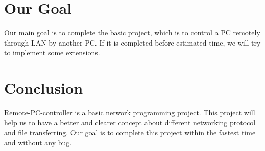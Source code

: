 \documentclass{article}
\begin{document}

\section{Our Goal}
Our main goal is to complete the basic project, which is to control a PC remotely through LAN by another PC. If it is completed before estimated time, we will try to implement some extensions.


\section{Conclusion}
Remote-PC-controller is a basic network programming project. This project will help us to have a better and clearer concept about different networking protocol and file transferring. Our goal is to complete this project within the fastest time and without any bug.
\end{document}
